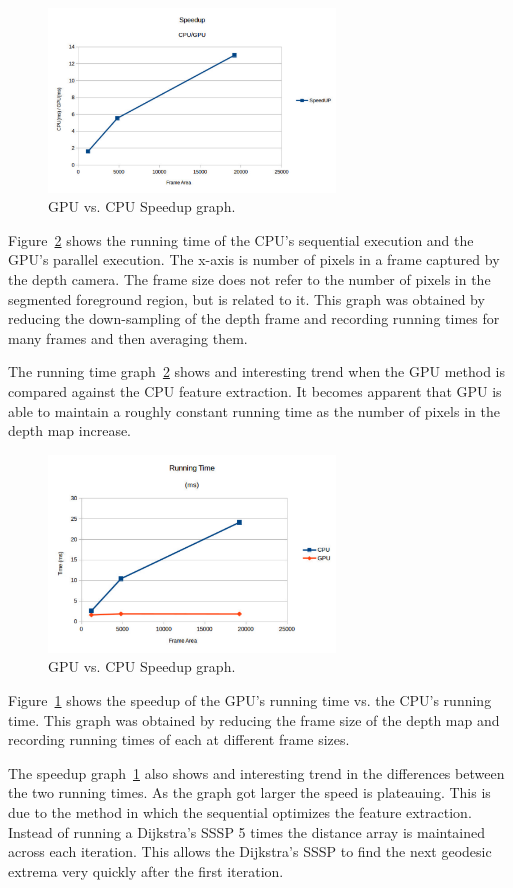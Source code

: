 \documentclass[conference]{IEEEtran}
\begin{document}
\begin{figure}[!t]
\centering
\includegraphics[width=3in]{speedup}
\caption{GPU vs. CPU Speedup graph.}
\label{fig:speedup}
\end{figure}
Figure~\ref{fig:runningtime} shows the running time of the CPU's sequential execution and the GPU's parallel execution. The x-axis is number of pixels in a frame captured by the depth camera. The frame size does not refer to the number of pixels in the segmented foreground region, but is related to it. This graph was obtained by reducing the down-sampling of the depth frame and recording running times for many frames and then averaging them.

The running time graph~\ref{fig:runningtime} shows and interesting trend when the GPU method is compared against the CPU feature extraction. It becomes apparent that GPU is able to maintain a roughly constant running time as the number of pixels in the depth map increase.
\begin{figure}[!t]
\centering
\includegraphics[width=3in]{runningtime}
\caption{GPU vs. CPU Speedup graph.}
\label{fig:runningtime}
\end{figure}
Figure~\ref{fig:speedup} shows the speedup of the GPU's running time vs. the CPU's running time. This graph was obtained by reducing the frame size of the depth map and recording running times of each at different frame sizes.

The speedup graph~\ref{fig:speedup} also shows and interesting trend in the differences between the two running times. As the graph got larger the speed is plateauing. This is due to the method in which the sequential optimizes the feature extraction. Instead of running a Dijkstra's SSSP 5 times the distance array is maintained across each iteration. This allows the Dijkstra's SSSP to find the next geodesic extrema very quickly after the first iteration.
\end{document}
